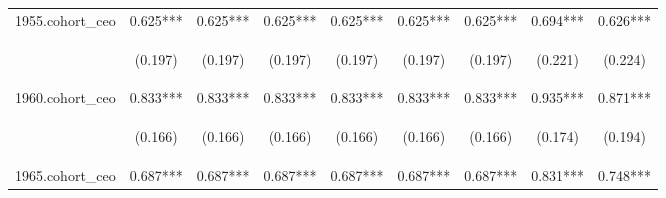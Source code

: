 \begin{center}
\begin{tabular}{lcccccccc}
1955.cohort\_ceo & 0.625*** & 0.625*** & 0.625*** & 0.625*** & 0.625*** & 0.625*** & 0.694*** & 0.626*** \\
\vspace{4pt} & \begin{footnotesize}(0.197)\end{footnotesize} & \begin{footnotesize}(0.197)\end{footnotesize} & \begin{footnotesize}(0.197)\end{footnotesize} & \begin{footnotesize}(0.197)\end{footnotesize} & \begin{footnotesize}(0.197)\end{footnotesize} & \begin{footnotesize}(0.197)\end{footnotesize} & \begin{footnotesize}(0.221)\end{footnotesize} & \begin{footnotesize}(0.224)\end{footnotesize} \\
1960.cohort\_ceo & 0.833*** & 0.833*** & 0.833*** & 0.833*** & 0.833*** & 0.833*** & 0.935*** & 0.871*** \\
\vspace{4pt} & \begin{footnotesize}(0.166)\end{footnotesize} & \begin{footnotesize}(0.166)\end{footnotesize} & \begin{footnotesize}(0.166)\end{footnotesize} & \begin{footnotesize}(0.166)\end{footnotesize} & \begin{footnotesize}(0.166)\end{footnotesize} & \begin{footnotesize}(0.166)\end{footnotesize} & \begin{footnotesize}(0.174)\end{footnotesize} & \begin{footnotesize}(0.194)\end{footnotesize} \\
1965.cohort\_ceo & 0.687*** & 0.687*** & 0.687*** & 0.687*** & 0.687*** & 0.687*** & 0.831*** & 0.748*** \\

\end{tabular}
\end{center}
